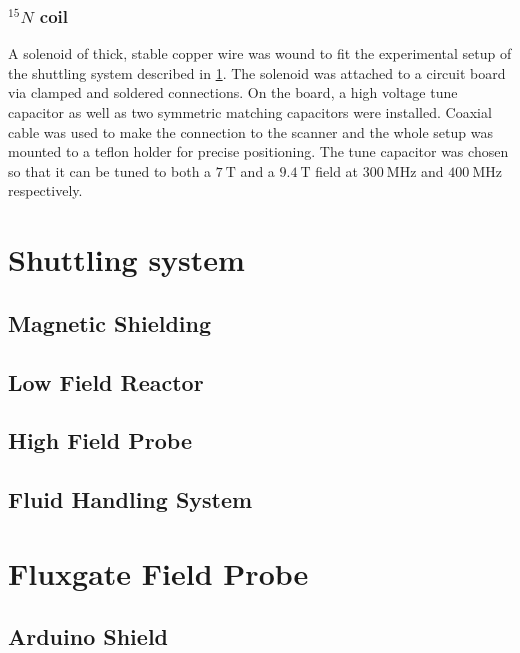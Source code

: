 			\subsubsection{$^{15}N$ coil}
				A solenoid of thick, stable copper wire was wound to fit the experimental setup of
				the shuttling system described in \ref{sec:shuttlingSystem}. The solenoid was
				attached to a circuit board via clamped and soldered connections. On the board, a
				high voltage tune capacitor as well as two symmetric matching capacitors were
				installed. Coaxial cable was used to make the connection to the scanner and the
				whole setup was mounted to a teflon holder for precise positioning.
				The tune capacitor was chosen so that it can be tuned to both a $\SI{7}{\tesla}$ and
				a $\SI{9.4}{\tesla}$ field at $\SI{300}{\MHz}$ and $\SI{400}{\MHz}$ respectively.
				
	\section{Shuttling system}\label{sec:shuttlingSystem}
		\subsection{Magnetic Shielding}
		\subsection{Low Field Reactor}
		\subsection{High Field Probe}
		\subsection{Fluid Handling System} 
	\section{Fluxgate Field Probe}
		\subsection{Arduino Shield}
		\subsection{}
%

